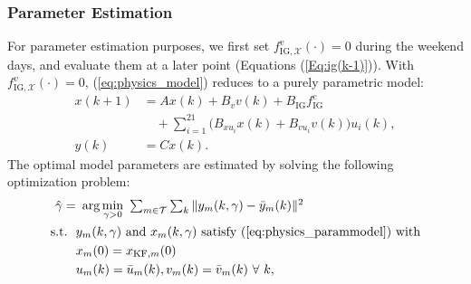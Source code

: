 \subsubsection{Parameter Estimation}
For parameter estimation purposes, we first set $f_{\text{IG},\mathcal{X}}^v(\cdot) = 0$ during the weekend days, and evaluate them at a later point (Equations (\ref{Eq:ig(k-1)})). With $f_{\text{IG},\mathcal{X}}^v(\cdot) = 0$, (\ref{eq:physics_model}) reduces to a purely parametric model:
\begin{equation}\label{eq:physics_parammodel}
\begin{aligned}
x(k+1) &= Ax(k)+B_v v(k) + B_\text{IG} f_\text{IG}^c\\
	& \quad + \textstyle \sum_{i=1}^{21} \big( B_{xu_i} x(k) + B_{vu_i} v(k) \big) u_i(k), \\
y(k) &= C x(k).
\end{aligned}
\end{equation}
The optimal model parameters are estimated by solving the following optimization problem:
\begin{equation}\label{eq:physics_opt}
\begin{aligned}
 \hat{\gamma} =&~\arg\min_{\gamma > 0}~\textstyle \sum_{m \in \mathcal{T}} \sum_k \Vert y_m(k,\gamma) - \bar y_m(k) \Vert ^ 2 \\
\text{s.t.~~}
&y_m(k,\gamma) \text{~and~} x_m(k,\gamma) \text{~satisfy (\ref{eq:physics_parammodel}) with}\\
&x_m(0) = x_{\text{KF},m}(0)\\
&u_m(k) = \bar u_m(k), v_m(k) = \bar v_m(k)~\forall~k,\\
\end{aligned}
\end{equation}

